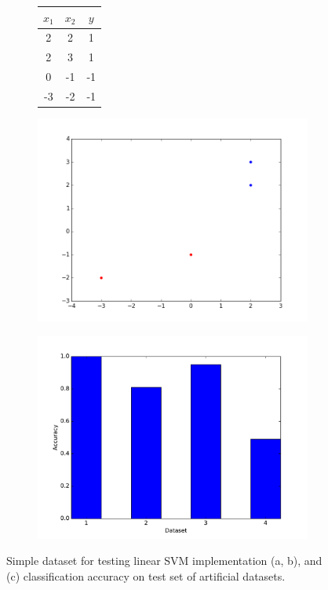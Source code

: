 \documentclass[10pt,psamsfonts]{amsart}
\theoremstyle{definition}
\theoremstyle{remark}
\numberwithin{equation}{section}
\begin{document}
\begin{figure}[h!]
	\centering
\begin{subfigure}[b]{0.15\textwidth}
	\centering
\begin{tabular}{|c|c|c|}\hline
$x_1$ & $x_2$ & $y$ \\\hline
2 & 2 & 1 \\
2 & 3 & 1 \\
0 & -1 & -1\\
-3 & -2 & -1\\\hline
\end{tabular}
\vspace{0.15in}
\caption{}
\end{subfigure}
\begin{subfigure}[b]{0.2\textwidth}
\includegraphics[width=\textwidth]{hw2-2_1-1.png}
\caption{}
\end{subfigure}
\begin{subfigure}[b]{0.2\textwidth}
	\includegraphics[width=\textwidth]{hw2_2-2_acc.pdf}
	\caption{}
\end{subfigure}
\caption{Simple dataset for testing linear SVM implementation (a, b), and (c) classification accuracy on test set of artificial datasets.}
\end{figure}
\end{document}
